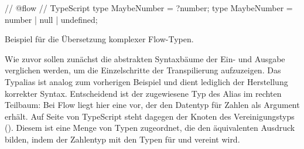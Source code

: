 {\bigbreak
\begin{listing}[htb]
\begin{textcode}
// @flow                               // TypeScript
type MaybeNumber = ?number;           type MaybeNumber = number | null | undefined;
\end{textcode}
\listingvspace
\caption{Beispiel für die Übersetzung komplexer Flow-Typen.}
\label{code:example-complex}
\end{listing}

Wie zuvor sollen zunächst die abstrakten Syntaxbäume der Ein- und Ausgabe verglichen werden, um die Einzelschritte der Transpilierung aufzuzeigen. Das Typalias ist analog zum vorherigen Beispiel und dient lediglich der Herstellung korrekter Syntax. Entscheidend ist der zugewiesene Typ des Alias im rechten Teilbaum: Bei Flow liegt hier eine  vor, der den Datentyp für Zahlen als Argument erhält. Auf Seite von TypeScript steht dagegen der Knoten des Vereinigungstyps (). Diesem ist eine Menge von Typen zugeordnet, die den äquivalenten Ausdruck bilden, indem der Zahlentyp mit den Typen für  und  vereint wird.

}
